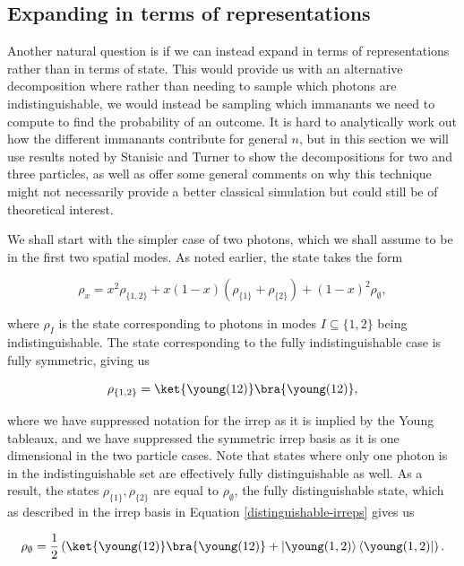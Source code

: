 \subsection{Expanding in terms of representations}
\label{ssec:irrep-expansion}

Another natural question is if we can instead expand in terms of representations rather than in terms of state. This would provide us with an alternative decomposition where rather than needing to sample which photons are indistinguishable, we would instead be sampling which immanants we need to compute to find the probability of an outcome. It is hard to analytically work out how the different immanants contribute for general $n$, but in this section we will use results noted by Stanisic and Turner \cite{stanisic2018} to show the decompositions for two and three particles, as well as offer some general comments on why this technique might not necessarily provide a better classical simulation but could still be of theoretical interest.

We shall start with the simpler case of two photons, which we shall assume to be in the first two spatial modes. As noted earlier, the state takes the form

\begin{equation}
\rho_x = x^2\rho_{\{1,2\}} + x(1-x)(\rho_{\{1\}} + \rho_{\{2\}}) + (1-x)^2\rho_{\emptyset},
\end{equation}

\noindent where $\rho_I$ is the state corresponding to photons in modes $I\subseteq\{1,2\}$ being indistinguishable. The state corresponding to the fully indistinguishable case is fully symmetric, giving us

\begin{equation}
\rho_{\{1,2\}} = \ket{\young(12)}\bra{\young(12)},
\end{equation}

\noindent where we have suppressed notation for the irrep as it is implied by the Young tableaux, and we have suppressed the symmetric irrep basis as it is one dimensional in the two particle cases. Note that states where only one photon is in the indistinguishable set are effectively fully distinguishable as well. As a result, the states $\rho_{\{1\}}, \rho_{\{2\}}$ are equal to $\rho_{\emptyset}$, the fully distinguishable state, which as described in the irrep basis in Equation \ref{distinguishable-irreps} gives us

\begin{equation}
\rho_\emptyset = \frac{1}{2}\left(\ket{\young(12)}\bra{\young(12)}+\left|\young(1,2)\right\rangle\left\langle\young(1,2)\right|\right).
\end{equation}

